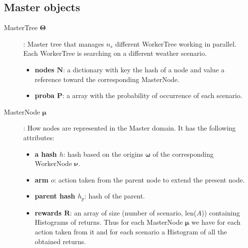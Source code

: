 \documentclass[letterpaper]{article} %
\newcommand{\bsy}[1]{\boldsymbol{#1}}
\begin{document}
\subsection*{Master objects}
\begin{description}
\item[MasterTree $\bsy{\Theta}$]: Master tree that manages $n_s$ different WorkerTree working in parallel. Each WorkerTree is searching on a different weather scenario. 
\begin{itemize}
    \item \textbf{nodes $\bsy{N}$}: a dictionary with key the hash of a node and value a reference toward the corresponding MasterNode. 
    \item \textbf{proba $\bsy{P}$}: a array with the probability of occurrence of each scenario. 
\end{itemize}

\item[MasterNode $\bsy{\mu}$]: How nodes are represented in the Master domain. It has the following attributes:  
\begin{itemize}
    \item \textbf{a hash $h$}: hash based on the origins $\bsy{\omega}$ of the corresponding WorkerNode $\bsy{\nu}$.
    \item \textbf{arm $o$}: action taken from the parent node to extend the present node. 
    \item \textbf{parent hash $h_p$}: hash of the parent. 
    \item \textbf{rewards $\bsy{R}$}: an array of size (number of scenario, len($A$)) containing Histograms of returns. Thus for each MasterNode $\bsy{\mu}$ we have for each action taken from it and for each scenario a Histogram of all the obtained returns. 
\end{itemize}
\end{description}
\end{document}
